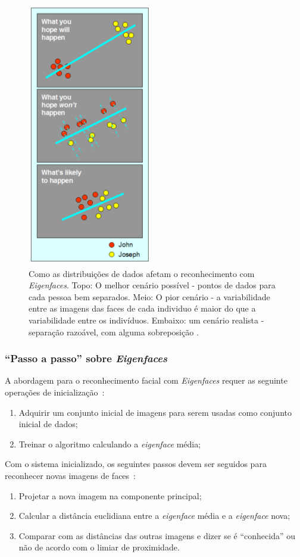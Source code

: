 	\begin{figure}[hbt]
		\begin{center}
			\includegraphics[scale=6.0]{figuras/2.FundamentacaoTeorica/espacoPCA.png}
		\end{center}
		\caption{Como as distribuições de dados afetam o reconhecimento com \textit{Eigenfaces}. Topo: O melhor cenário possível - pontos de dados para cada pessoa bem separados. Meio: O pior cenário - a variabilidade entre as imagens das faces de cada individuo é maior do que a variabilidade entre os indivíduos. Embaixo: um cenário realista - separação razoável, com alguma sobreposição \cite{hewitt}.}
		\label{exemploEspacoPCA}
	\end{figure}

\subsubsection{``Passo a passo'' sobre \textit{Eigenfaces}}

A abordagem para o reconhecimento facial com \textit{Eigenfaces} requer as seguinte operações de inicialização~\cite{turk}:

	\begin{enumerate}
		\item Adquirir um conjunto inicial de imagens para serem usadas como conjunto inicial de dados;
		\item Treinar o algoritmo calculando a \textit{eigenface} média;
	\end{enumerate}

Com o sistema inicializado, os seguintes passos devem ser seguidos para reconhecer novas imagens de faces~\cite{turk}:
	
	\begin{enumerate}
		\item Projetar a nova imagem na componente principal;
		\item Calcular a distância euclidiana entre a \textit{eigenface} média e a \textit{eigenface} nova;
		\item Comparar com as distâncias das outras imagens e dizer se é ``conhecida'' ou não de acordo com o limiar de proximidade.
	\end{enumerate}